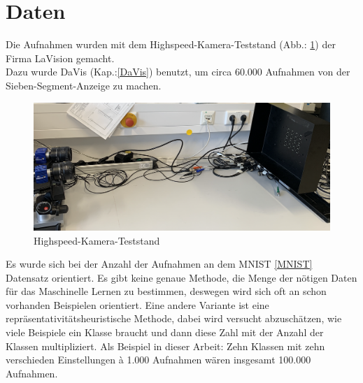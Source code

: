 \section{Daten} \label{Kapitel: Daten}
Die Aufnahmen wurden mit dem Highspeed-Kamera-Teststand (Abb.: \ref{HTA}) der Firma LaVision gemacht. \\
Dazu wurde DaVis (Kap.:\ref{DaVis}) benutzt, um circa 60.000 Aufnahmen von der Sieben-Segment-Anzeige zu machen.\\
\begin{figure}[h]
\centering
\includegraphics[scale=0.5]{pic/HTA}
\caption{Highspeed-Kamera-Teststand}
\label{HTA}
\end{figure}
Es wurde sich bei der Anzahl der Aufnahmen an dem MNIST \ref{MNIST} Datensatz orientiert. Es gibt keine genaue Methode, die Menge der nötigen Daten für das Maschinelle Lernen zu bestimmen, deswegen wird sich oft an schon vorhanden Beispielen orientiert. Eine andere Variante ist eine repräsentativitätsheuristische Methode, dabei wird versucht abzuschätzen, wie viele Beispiele ein Klasse braucht und dann diese Zahl mit der Anzahl der Klassen multipliziert. Als Beispiel in dieser Arbeit: Zehn Klassen mit zehn verschieden Einstellungen \`{a}  1.000 Aufnahmen wären insgesamt 100.000 Aufnahmen.
